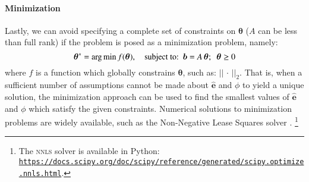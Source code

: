\paragraph{Minimization}
Lastly, we can avoid specifying a complete set of constraints on $\bm{\theta}$		%
($A$ can be less than full rank)
if the problem is posed as a minimization problem, namely:
\begin{equation}\label{eq:system-optimize}
\bm{\theta}^{*} = {\arg \min}
\thinspace f(\bm{\theta}),
\quad \textrm{subject to:}
\enspace\bm{b} = A\thinspace\bm{\theta};
\enspace\bm{\theta} \ge 0
\end{equation}
where $f$ is a function which globally constrains $\bm{\theta}$,
such as: ${\left|\left| \,\cdot\, \right|\right|}_2$.
That is, when a sufficient number of assumptions cannot be made about $\bm{\hat{e}}$ and $\phi$		%
to yield a unique solution,
the minimization approach can be used to find the smallest values of $\bm{\hat{e}}$ and $\phi$
which satisfy the given constraints.														%
Numerical solutions to minimization problems are widely available,
such as the Non-Negative Lease Squares solver \citep{Lawson1995}.%
\footnote{The \textsc{nnls} solver is available in Python:
   \href{https://docs.scipy.org/doc/scipy/reference/generated/scipy.optimize.nnls.html}
{\texttt{https://docs.scipy.org/doc/scipy/reference/generated/scipy.optimize.nnls.html}}.}
